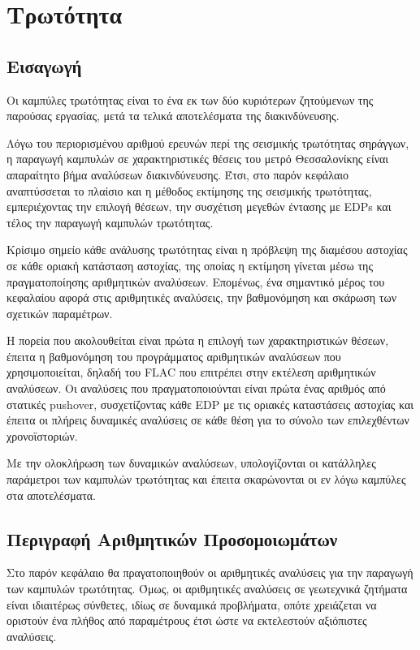 \newpage
\pagestyle{fancy}

\chapter{Τρωτότητα}
\label{Ch:frag}
\section{Εισαγωγή}
Οι καμπύλες τρωτότητας είναι το ένα εκ των δύο κυριότερων ζητούμενων της παρούσας εργασίας, μετά τα τελικά αποτελέσματα της διακινδύνευσης.

Λόγω του περιορισμένου αριθμού ερευνών περί της σεισμικής τρωτότητας σηράγγων, η παραγωγή καμπυλών σε χαρακτηριστικές θέσεις του μετρό Θεσσαλονίκης είναι απαραίτητο βήμα αναλύσεων διακινδύνευσης. Έτσι, στο παρόν κεφάλαιο αναπτύσσεται το πλαίσιο και η μέθοδος εκτίμησης της σεισμικής τρωτότητας, εμπεριέχοντας την επιλογή θέσεων, την συσχέτιση μεγεθών έντασης με EDPs και τέλος την παραγωγή καμπυλών τρωτότητας.

Κρίσιμο σημείο κάθε ανάλυσης τρωτότητας είναι η πρόβλεψη της διαμέσου αστοχίας σε κάθε οριακή κατάσταση αστοχίας, της οποίας η εκτίμηση γίνεται μέσω της πραγματοποίησης αριθμητικών αναλύσεων. Επομένως, ένα σημαντικό μέρος του κεφαλαίου αφορά στις αριθμητικές αναλύσεις, την βαθμονόμηση και σκάρωση των σχετικών παραμέτρων.

Η πορεία που ακολουθείται είναι πρώτα η επιλογή των χαρακτηριστικών θέσεων, έπειτα η βαθμονόμηση του προγράμματος αριθμητικών αναλύσεων που χρησιμοποιείται, δηλαδή του FLAC που επιτρέπει στην εκτέλεση αριθμητικών αναλύσεων. Οι αναλύσεις που πραγματοποιούνται είναι πρώτα ένας αριθμός από στατικές pushover, συσχετίζοντας κάθε EDP με τις οριακές καταστάσεις αστοχίας και έπειτα οι πλήρεις δυναμικές αναλύσεις σε κάθε θέση για το σύνολο των επιλεχθέντων χρονοϊστοριών.

Με την ολοκλήρωση των δυναμικών αναλύσεων, υπολογίζονται οι κατάλληλες παράμετροι των καμπυλών τρωτότητας και έπειτα σκαρώνονται οι εν λόγω καμπύλες στα αποτελέσματα.

\section{Περιγραφή Αριθμητικών Προσομοιωμάτων}
Στο παρόν κεφάλαιο θα πραγατοποιηθούν οι αριθμητικές αναλύσεις για την παραγωγή των καμπυλών τρωτότητας. Όμως, οι αριθμητικές αναλύσεις σε γεωτεχνικά ζητήματα είναι ιδιαιτέρως σύνθετες, ιδίως σε δυναμικά προβλήματα, οπότε χρειάζεται να οριστούν ένα πλήθος από παραμέτρους έτσι ώστε να εκτελεστούν αξιόπιστες αναλύσεις.

